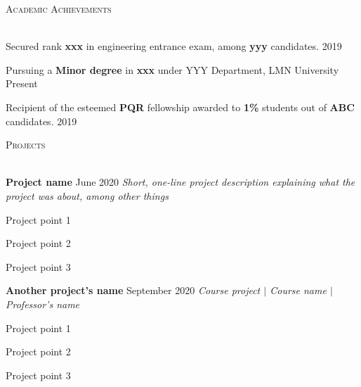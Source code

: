\documentclass[12pt]{article}   %
\renewcommand{\section}[1]{
    \textsc{#1}
    \vspace*{-10pt} \\ \hspace*{-5pt} 
    \hrulefill \\
    \vspace*{-15pt}
}
\newcommand{\smallbullet}{
    \small$\bullet$
}
\newenvironment{bullet-list-major}{
    \begin{list}{
        \smallbullet
    }{
        \setlength\leftmargin{15pt}\topsep 0pt \itemsep -4pt
    }
} {
    \end{list}
}
\newcommand{\bigblock}[3]{
    {
        \hspace*{5pt} \textbf{#1} \hfill #2 \newline
        \hspace*{5pt} \textit{#3}
    }
}
\newenvironment{bullet-list-minor}{
    \begin{list}{
        \smallbullet
    }{
        \setlength\leftmargin{30pt}\topsep 0pt \itemsep -3pt
    }
} {
    \end{list}
}
\begin{document}
    \vspace*{48.63mm}   %



    \section{Academic Achievements}
    \begin{bullet-list-major}
        \item Secured rank \textbf{xxx} in engineering entrance exam, among \textbf{yyy} candidates. \hfill 2019
        \item Pursuing a \textbf{Minor degree} in \textbf{xxx} under YYY Department, LMN University \hfill Present
        \item Recipient of the esteemed \textbf{PQR} fellowship awarded to \textbf{1\%} students out
        of \textbf{ABC} candidates. \hfill 2019
    \end{bullet-list-major}


    \section{Projects}

    \bigblock{
        Project name
    }{
        June 2020
    }{
        Short, one-line project description explaining what the project was about, among other things
    }
	\begin{bullet-list-minor}
        \item Project point 1
        \item Project point 2
        \item Project point 3
    \end{bullet-list-minor}
    

    \bigblock{
        Another project's name
    }{
        September 2020
    }{
        Course project \(|\) Course name \(|\) Professor's name
    }
	\begin{bullet-list-minor}
        \item Project point 1
        \item Project point 2
        \item Project point 3
    \end{bullet-list-minor}
\end{document}
